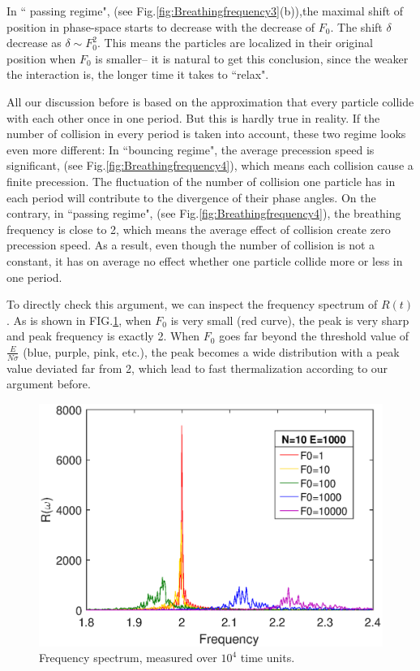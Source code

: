 \documentclass[aps,pre,twocolumn,groupedaddress]{revtex4-1}
\begin{document}
In `` passing regime", (see Fig.\ref{fig:Breathingfrequency3}(b)),the maximal shift of position in phase-space starts to decrease with the decrease of $F_0$. The shift $\delta$ decrease as $\delta\sim F_0^2$. This means the particles are localized in their original position when $F_0$ is smaller-- it is natural to get this conclusion, since the weaker the interaction is, the longer time it takes to ``relax".

All our discussion before is based on the approximation that every particle collide with each other once in one period. But this is hardly true in reality. If the number of collision in every period is taken into account, these two regime looks even more different: In ``bouncing regime", the average precession speed is significant, (see Fig.\ref{fig:Breathingfrequency4}), which means each collision cause a finite precession. The fluctuation of the number of collision one particle has in each period will contribute to the divergence of their phase angles. On the contrary, in ``passing regime", (see Fig.\ref{fig:Breathingfrequency4}), the breathing frequency is close to 2, which means the average effect of collision create zero precession speed. As a result, even though the number of collision is not a constant, it has on average no effect whether one particle collide more or less in one period. 

To directly check this argument, we can inspect the frequency spectrum of $R(t)$. As is shown in FIG.\ref{fig:frequencyspectrum}, when $F_0$ is very small (red curve), the peak is very sharp and peak frequency is exactly 2. When $F_0$ goes far beyond the threshold value of $\frac{E}{N\sigma}$ (blue, purple, pink, etc.), the peak becomes a wide distribution with a peak value deviated far from 2, which lead to  fast thermalization according to our argument before.

\begin{figure}[hbtp]
\centering
\includegraphics[scale=0.5]{ZhiyuPictures/freq_spectrum_N=10_E=1000_pre_rev.eps}
\caption{Frequency spectrum, measured over $10^4$ time units.\label{fig:frequencyspectrum}}
\end{figure}
\end{document}
